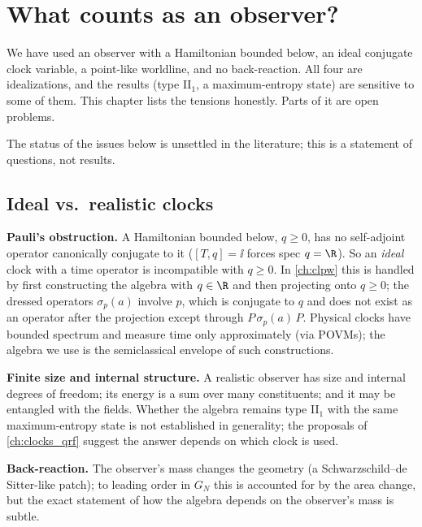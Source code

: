\chapter{What counts as an observer?}\label{ch:what_observer}

\begin{physmotiv}
We have used an observer with a Hamiltonian bounded below, an ideal conjugate clock variable, a point-like worldline, and no back-reaction. All four are idealizations, and the results (type II$_1$, a maximum-entropy state) are sensitive to some of them. This chapter lists the tensions honestly. Parts of it are open problems.
\end{physmotiv}

\begin{unsettled}
The status of the issues below is unsettled in the literature; this is a statement of questions, not results.
\end{unsettled}

\section{Ideal vs.\ realistic clocks}

\textbf{Pauli's obstruction.} A Hamiltonian bounded below, $q\ge0$, has no self-adjoint operator canonically conjugate to it ($[T,q]=\ii$ forces spec $q=\R$). So an \emph{ideal} clock with a time operator is incompatible with $q\ge0$. In \cref{ch:clpw} this is handled by first constructing the algebra with $q\in\R$ and then projecting onto $q\ge0$; the dressed operators $\sigma_p(a)$ involve $p$, which is conjugate to $q$ and does not exist as an operator after the projection except through $P\,\sigma_p(a)\,P$. Physical clocks have bounded spectrum and measure time only approximately (via POVMs); the algebra we use is the semiclassical envelope of such constructions.

\textbf{Finite size and internal structure.} A realistic observer has size and internal degrees of freedom; its energy is a sum over many constituents; and it may be entangled with the fields. Whether the algebra remains type II$_1$ with the same maximum-entropy state is not established in generality; the proposals of \cref{ch:clocks_qrf} suggest the answer depends on which clock is used.

\textbf{Back-reaction.} The observer's mass changes the geometry (a Schwarzschild--de Sitter-like patch); to leading order in $G_N$ this is accounted for by the area change, but the exact statement of how the algebra depends on the observer's mass is subtle.

